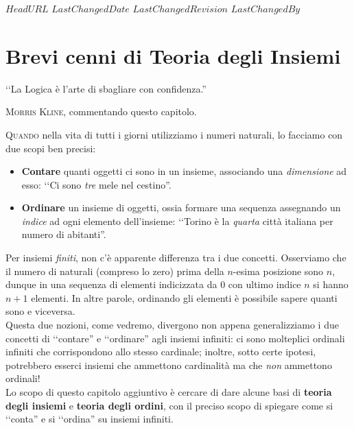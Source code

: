 \svnidlong
{$HeadURL$}
{$LastChangedDate$}
{$LastChangedRevision$}
{$LastChangedBy$}

\chapter{Brevi cenni di Teoria degli Insiemi}
\begin{introduction}
‘‘La Logica è l'arte di sbagliare con confidenza.''
\begin{flushright}
	\textsc{Morris Kline,} commentando questo capitolo.
\end{flushright}
\end{introduction}
\lettrine[findent=1pt, nindent=0pt]{Q}{uando} nella vita di tutti i giorni utilizziamo i numeri naturali, lo facciamo con due scopi ben precisi:
\begin{itemize}
	\item \textbf{Contare} quanti oggetti ci sono in un insieme, associando una \textit{dimensione} ad esso: ‘‘Ci sono \textit{tre} mele nel cestino''.
	\item \textbf{Ordinare} un insieme di oggetti, ossia formare una sequenza assegnando un \textit{indice} ad ogni elemento dell'insieme: ‘‘Torino è la \textit{quarta} città italiana per numero di abitanti''.
\end{itemize}
Per insiemi \textit{finiti}, non c'è apparente differenza tra i due concetti. Osserviamo che il numero di naturali (compreso lo zero) prima della $n$-esima posizione sono $n$, dunque in una sequenza di elementi indicizzata da $0$ con ultimo indice $n$ si hanno $n+1$ elementi. In altre parole, ordinando gli elementi è possibile sapere quanti sono e viceversa.\\
Questa due nozioni, come vedremo, divergono non appena generalizziamo i due concetti di ‘‘contare'' e ‘‘ordinare'' agli insiemi infiniti: ci sono molteplici ordinali infiniti che corrispondono allo stesso cardinale; inoltre, sotto certe ipotesi, potrebbero esserci insiemi che ammettono cardinalità ma che \textit{non} ammettono ordinali!\\
Lo scopo di questo capitolo aggiuntivo è cercare di dare alcune basi di \textbf{teoria degli insiemi} e \textbf{teoria degli ordini}, con il preciso scopo di spiegare come si ‘‘conta'' e si ‘‘ordina'' su insiemi infiniti.\\
